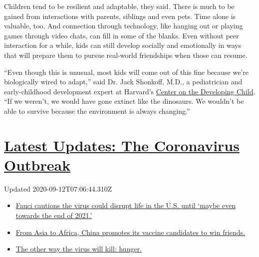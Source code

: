 Children tend to be resilient and adaptable, they said. There is much to
be gained from interactions with parents, siblings and even pets. Time
alone is valuable, too. And connection through technology, like hanging
out or playing games through video chats, can fill in some of the
blanks. Even without peer interaction for a while, kids can still
develop socially and emotionally in ways that will prepare them to
pursue real-world friendships when those can resume.

``Even though this is unusual, most kids will come out of this fine
because we're biologically wired to adapt,'' said Dr. Jack Shonkoff,
M.D., a pediatrician and early-childhood development expert at Harvard's
\href{https://developingchild.harvard.edu/}{Center on the Developing
Child}. ``If we weren't, we would have gone extinct like the dinosaurs.
We wouldn't be able to survive because the environment is always
changing.''

\hypertarget{latest-updates-the-coronavirus-outbreak}{%
\section{\texorpdfstring{\href{https://www.nytimes3xbfgragh.onion/2020/09/11/world/covid-19-coronavirus.html?action=click\&pgtype=Article\&state=default\&region=MAIN_CONTENT_1\&context=storylines_live_updates}{Latest
Updates: The Coronavirus
Outbreak}}{Latest Updates: The Coronavirus Outbreak}}\label{latest-updates-the-coronavirus-outbreak}}

Updated 2020-09-12T07:06:44.310Z

\begin{itemize}
\tightlist
\item
  \href{https://www.nytimes3xbfgragh.onion/2020/09/11/world/covid-19-coronavirus.html?action=click\&pgtype=Article\&state=default\&region=MAIN_CONTENT_1\&context=storylines_live_updates\#link-dfb8a16}{Fauci
  cautions the virus could disrupt life in the U.S. until `maybe even
  towards the end of 2021.'}
\item
  \href{https://www.nytimes3xbfgragh.onion/2020/09/11/world/covid-19-coronavirus.html?action=click\&pgtype=Article\&state=default\&region=MAIN_CONTENT_1\&context=storylines_live_updates\#link-7104d154}{From
  Asia to Africa, China promotes its vaccine candidates to win friends.}
\item
  \href{https://www.nytimes3xbfgragh.onion/2020/09/11/world/covid-19-coronavirus.html?action=click\&pgtype=Article\&state=default\&region=MAIN_CONTENT_1\&context=storylines_live_updates\#link-393ad215}{The
  other way the virus will kill: hunger.}
\end{itemize}

